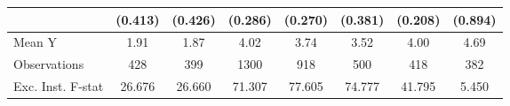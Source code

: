 {\begin{tabular}{l*{7}{c}}
            &     (0.413)         &     (0.426)         &     (0.286)         &     (0.270)         &     (0.381)         &     (0.208)         &     (0.894)         \\
\midrule
Mean Y      &        1.91         &        1.87         &        4.02         &        3.74         &        3.52         &        4.00         &        4.69         \\
Observations&         428         &         399         &        1300         &         918         &         500         &         418         &         382         \\
Exc. Inst. F-stat&      26.676         &      26.660         &      71.307         &      77.605         &      74.777         &      41.795         &       5.450         \\
\bottomrule
\end{tabular}
}
